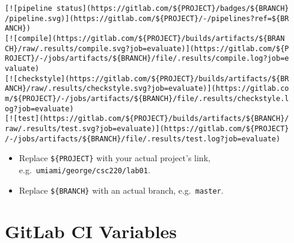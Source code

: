 \begin{enumerate}
\begin{verbatim}
[![pipeline status](https://gitlab.com/${PROJECT}/badges/${BRANCH}
/pipeline.svg)](https://gitlab.com/${PROJECT}/-/pipelines?ref=${BR
ANCH})
[![compile](https://gitlab.com/${PROJECT}/builds/artifacts/${BRAN
CH}/raw/.results/compile.svg?job=evaluate)](https://gitlab.com/${P
ROJECT}/-/jobs/artifacts/${BRANCH}/file/.results/compile.log?job=e
valuate)
[![checkstyle](https://gitlab.com/${PROJECT}/builds/artifacts/${BR
ANCH}/raw/.results/checkstyle.svg?job=evaluate)](https://gitlab.co
m/${PROJECT}/-/jobs/artifacts/${BRANCH}/file/.results/checkstyle.l
og?job=evaluate)
[![test](https://gitlab.com/${PROJECT}/builds/artifacts/${BRANCH}/
raw/.results/test.svg?job=evaluate)](https://gitlab.com/${PROJECT}
/-/jobs/artifacts/${BRANCH}/file/.results/test.log?job=evaluate)
\end{verbatim}

  \begin{itemize}
  \item
    Replace \texttt{\$\{PROJECT\}} with your actual project's link, e.g.~\texttt{umiami/george/csc220/lab01}.
  \item
    Replace \texttt{\$\{BRANCH\}} with an actual branch, e.g.~\texttt{master}.
  \end{itemize}
\end{enumerate}

\section{GitLab CI Variables}\label{gitlab-ci-variables}

